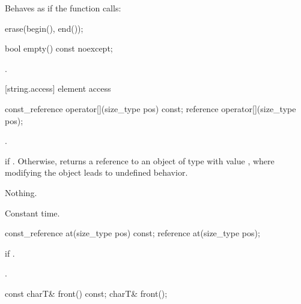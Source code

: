 \begin{itemdescr}
\pnum
\effects
Behaves as if the function calls:

\begin{codeblock}
erase(begin(), end());
\end{codeblock}
\end{itemdescr}

%
%
\begin{itemdecl}
bool empty() const noexcept;
\end{itemdecl}

\begin{itemdescr}
\pnum
\returns
{}.
\end{itemdescr}

[string.access]{ element access}

%
%
\begin{itemdecl}
const_reference operator[](size_type pos) const;
reference       operator[](size_type pos);
\end{itemdecl}

\begin{itemdescr}
\pnum
\requires {}.

\pnum
\returns {} if . Otherwise,
returns a reference to an object of type  with value
, where modifying the object leads to
undefined behavior.

\pnum
\throws Nothing.

\pnum
\complexity Constant time.
\end{itemdescr}

%
%
\begin{itemdecl}
const_reference at(size_type pos) const;
reference       at(size_type pos);
\end{itemdecl}

\begin{itemdescr}
\pnum
\throws
{}
if
.

\pnum
\returns
{}.
\end{itemdescr}

%
%
\begin{itemdecl}
const charT& front() const;
charT& front();
\end{itemdecl}

